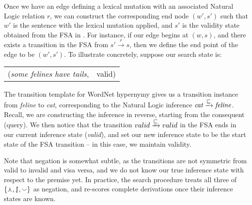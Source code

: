 Once we have an edge defining a lexical mutation with
  an associated Natural Logic relation $r$, we can construct the 
  corresponding end node
  $(w', s')$ such that $w'$ is the sentence with the lexical mutation
  applied, and $s'$ is the validity state obtained from the
  FSA in .
For instance, if our edge begins at $(w, s)$, and there exists
  a transition in the FSA from $s' \xrightarrow{r} s$, then we
  define the end point of the edge to be $(w', s')$.
To illustrate concretely, suppose our search state is:

\vspace{0.5em}
\begin{tabular}{lr}
(\textit{some felines have tails}, & valid)
\end{tabular}
\vspace{0.5em}

The transition template for WordNet hypernymy gives us a transition
  instance from \textit{feline} to \textit{cat}, corresponding to the
  Natural Logic inference 
  $\textit{cat} \xrightarrow{\sqsubseteq} \textit{feline}$.
Recall, we are constructing the inference in reverse, starting from
  the consequent (query).
We then notice that the transition 
  $valid \xrightarrow{\sqsubseteq} valid$ in the FSA ends in our current
  inference state (\textit{valid}), and set our new inference state to 
  be the start state of the FSA transition -- in this case, we maintain
  validity.

Note that negation is somewhat subtle, as the transitions are not
  symmetric from valid to invalid and visa versa, and we do not know
  our true inference state with respect to the premise
  yet.
In practice, the search procedure treats all three of
  $\{\curlywedge, \downharpoonleft\hspace{-1.25mm}\upharpoonright, \smallsmile\}$ as negation, and re-scores complete
  derivations once their inference states are known.

